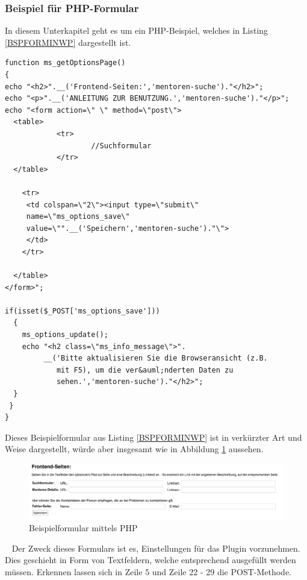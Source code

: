 \subsubsection{Beispiel für PHP-Formular}
In diesem Unterkapitel geht es um ein PHP-Beispiel, welches in Listing \ref{BSPFORMINWP} dargestellt ist.
\begin{lstlisting}
function ms_getOptionsPage()
{
echo "<h2>".__('Frontend-Seiten:','mentoren-suche')."</h2>";
echo "<p>".__('ANLEITUNG ZUR BENUTZUNG.','mentoren-suche')."</p>";
echo "<form action=\" \" method=\"post\">
  <table>
			<tr>
       		    	//Suchformular
			</tr>
  </table>
   		 
    <tr>
     <td colspan=\"2\"><input type=\"submit\" 
     name=\"ms_options_save\" 
     value=\"".__('Speichern','mentoren-suche')."\">
     </td>
    </tr>  
                     
  </table>
</form>";   
    
if(isset($_POST['ms_options_save']))
  {
    ms_options_update();
    echo "<h2 class=\"ms_info_message\">".
         __('Bitte aktualisieren Sie die Browseransicht (z.B. 
            mit F5), um die ver&auml;nderten Daten zu 
            sehen.','mentoren-suche')."</h2>"; 
  }
 }
}
\end{lstlisting}
Dieses Beispielformular aus Listing \ref{BSPFORMINWP} ist in verkürzter Art und Weise dargestellt, würde aber insgesamt wie in Abbildung \ref{img:BSPFORM} aussehen.
  \begin{figure}[htbp]
	\begin{center}
	\includegraphics[angle={360}, scale=0.45]{pictures/form.png}
	    \caption{Beispielformular mittels PHP}
	    \label{img:BSPFORM}
	\end{center}
   \end{figure}
   \ \newline
Der Zweck dieses Formulars ist es, Einstellungen für das Plugin vorzunehmen. Dies geschieht in Form von Textfeldern, welche entsprechend ausgefüllt werden müssen.\newline
Erkennen lassen sich in Zeile 5 und Zeile 22 - 29 die POST-Methode. \newline
